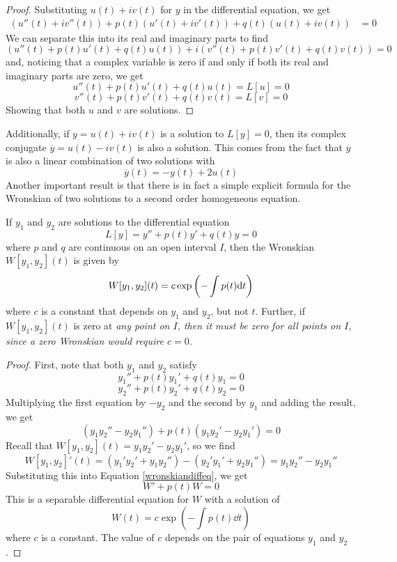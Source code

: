 \begin{proof}
    Substituting $u(t) + iv(t)$ for $y$ in the differential equation, we get
    \begin{align*}
        (u''(t) + iv''(t)) + p(t)(u'(t) + iv'(t)) + q(t)(u(t) + iv(t)) &= 0
    \end{align*}
    We can separate this into its real and imaginary parts to find
    \[ (u''(t) + p(t)u'(t) + q(t)u(t)) + i(v''(t) + p(t)v'(t) + q(t)v(t)) = 0\]
    and, noticing that a complex variable is zero if and only if both its real and imaginary parts are zero, we get
    \[ u''(t) + p(t)u'(t) + q(t)u(t) = L[u] = 0\]
    \[ v''(t) + p(t)v'(t) + q(t)v(t) = L[v] = 0\]
    Showing that both $u$ and $v$ are solutions.
\end{proof}
Additionally, if $y = u(t) + iv(t)$ is a solution to $L[y] = 0$, then its complex conjugate $\overline y = u(t) - iv(t)$ is also a solution. This comes from the fact that $\overline y$ is also a linear combination of two solutions with
\[ \overline y(t) = -y(t) + 2u(t)\]
Another important result is that there is in fact a simple explicit formula for the Wronskian of two solutions to a second order homogeneous equation.
\begin{theorem}
    If $y_1$ and $y_2$ are solutions to the differential equation
    \[ L[y] = y'' + p(t)y' + q(t)y = 0\]
    where $p$ and $q$ are continuous on an open interval $I$, then the Wronskian $W[y_1, y_2](t)$ is given by
    \[ W[y_1, y_2](t) = c\exp \pqty{-\int p(t)\dd t}\]
    where $c$ is a constant that depends on $y_1$ and $y_2$, but not $t$. Further, if $W[y_1, y_2](t)$ is zero at \it{any} point on $I$, then it must be zero for all points on $I$, since a zero Wronskian would require $c=0$.
\end{theorem}
\begin{proof}
    First, note that both $y_1$ and $y_2$ satisfy
    \[ y_1'' + p(t)y_1' + q(t)y_1 = 0 \]
    \[ y_2'' + p(t)y_2' + q(t)y_2 = 0 \]
    Multiplying the first equation by $-y_2$ and the second by $y_1$ and adding the result, we get
    \begin{equation}
        \label{wronskiandiffeq} (y_1y_2'' - y_2y_1'') + p(t)(y_1y_2' - y_2y_1') = 0
    \end{equation}
    Recall that $W[y_1, y_2](t) = y_1y_2' - y_2y_1'$, so we find
    \[ W[y_1, y_2]'(t) = (y_1'y_2' + y_1y_2'') - (y_2'y_1' + y_2y_1'') =  y_1y_2'' - y_2y_1''\]
    Substituting this into Equation \ref{wronskiandiffeq}, we get
    \[ W' + p(t)W = 0\]
    This is a separable differential equation for $W$ with a solution of
    \[ W(t) = c\exp(-\int p(t)\dd t)\]
    where $c$ is a constant. The value of $c$ depends on the pair of equations $y_1$ and $y_2$. 
\end{proof}
